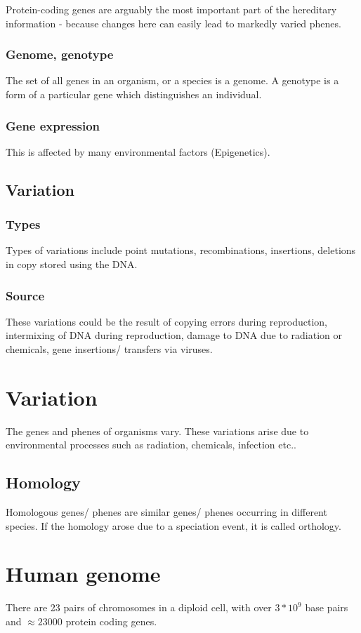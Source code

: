 \documentclass[oneside, article]{memoir}
\begin{document}
Protein-coding genes are arguably the most important part of the hereditary information - because changes here can easily lead to markedly varied phenes.

\subsubsection{Genome, genotype}
The set of all genes in an organism, or a species is a genome. A genotype is a form of a particular gene which distinguishes an individual.

\subsubsection{Gene expression}
This is affected by many environmental factors (Epigenetics).

\subsection{Variation}
\subsubsection{Types}
Types of variations include point mutations, recombinations, insertions, deletions in copy stored using the DNA.

\subsubsection{Source}
These variations could be the result of copying errors during reproduction, intermixing of DNA during reproduction, damage to DNA due to radiation or chemicals, gene insertions/ transfers via viruses.

\section{Variation}
The genes and phenes of organisms vary. These variations arise due to environmental processes such as radiation, chemicals, infection etc..

\subsection{Homology}
Homologous genes/ phenes are similar genes/ phenes occurring in different species. If the homology arose due to a speciation event, it is called orthology.

\section{Human genome}
There are 23 pairs of chromosomes in a diploid cell, with over $3*10^9$ base pairs and $\approx 23000$ protein coding genes.
\end{document}
